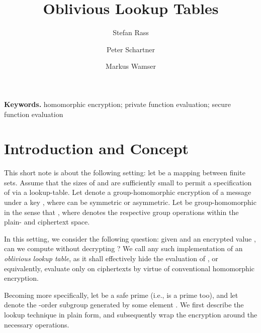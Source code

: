 \documentclass{llncs}
\begin{document}
\title{Oblivious Lookup Tables}

\author{Stefan Rass\and Peter Schartner\and Markus Wamser}


\maketitle              {}

\noindent\textbf{Keywords.} homomorphic encryption; private function
evaluation; secure function evaluation



\section{Introduction and Concept}
This short note is about the following setting: let  be a mapping
between finite sets. Assume that the sizes of  and  are sufficiently
small to permit a specification of  via a lookup-table. Let 
denote a group-homomorphic encryption of a message  under a key ,
where  can be symmetric or asymmetric. Let  be group-homomorphic in the
sense that , where
 denotes the respective group operations within the plain- and
ciphertext space.

In this setting, we consider the following question: given  and an
encrypted value , can we compute  without
decrypting ? We call any such implementation of  an \emph{oblivious
lookup table}, as it shall effectively hide the evaluation of , or
equivalently, evaluate  only on ciphertexts by virtue of conventional
homomorphic encryption.

Becoming more specifically, let  be a safe prime (i.e.,  is a
prime too), and let  denote the -order subgroup generated
by some element . We first describe the lookup technique in plain
form, and subsequently wrap the encryption around the necessary operations.
\end{document}
